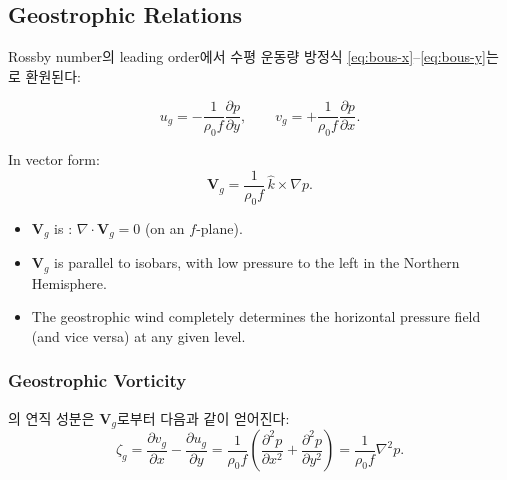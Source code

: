 \subsection{Geostrophic Relations}\label{subsec:geostrophic}

Rossby number의 leading order에서 수평 운동량 방정식
\eqref{eq:bous-x}--\eqref{eq:bous-y}는 로 환원된다:

\begin{equation}\label{eq:geowind}
  u_g = -\frac{1}{\rho_0 f}\frac{\partial p}{\partial y},
  \qquad
  v_g = +\frac{1}{\rho_0 f}\frac{\partial p}{\partial x}.
\end{equation}

\noindent
In vector form:
\begin{equation}\label{eq:geowind-vec}
  \mathbf{V}_g = \frac{1}{\rho_0 f}\,\hat{k}\times\nabla p.
\end{equation}

\begin{remark}
\begin{itemize}
  \item $\mathbf{V}_g$ is :
        $\nabla\cdot\mathbf{V}_g = 0$ (on an $f$-plane).
  \item $\mathbf{V}_g$ is parallel to isobars, with low pressure to the left
        in the Northern Hemisphere.
  \item The geostrophic wind completely determines the horizontal pressure field
        (and vice versa) at any given level.
\end{itemize}
\end{remark}

\subsubsection{Geostrophic Vorticity}

의 연직 성분은 $\mathbf{V}_g$로부터 다음과 같이 얻어진다:
\begin{equation}\label{eq:geovort}
  \zeta_g
  = \frac{\partial v_g}{\partial x} - \frac{\partial u_g}{\partial y}
  = \frac{1}{\rho_0 f}\left(
      \frac{\partial^2 p}{\partial x^2}
    + \frac{\partial^2 p}{\partial y^2}
  \right)
  = \frac{1}{\rho_0 f}\nabla^2 p.
\end{equation}

